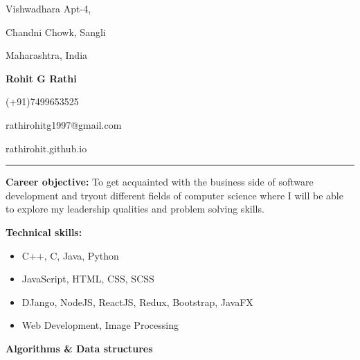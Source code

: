 \documentclass[a4paper,11pt]{article}
\begin{document}
	\begin{center}
		\begin{minipage}[b]{0.33333\textwidth}
			\raggedright
			Vishwadhara Apt-4,\par
			Chandni Chowk, Sangli\par
			Maharashtra, India
		\end{minipage}%
		\begin{minipage}[b]{0.33333\textwidth}
			\centering
			\begin{huge}
				\textbf{Rohit G Rathi}
			\end{huge}
		\end{minipage}%
		\begin{minipage}[b]{0.33333\textwidth}
			\raggedleft
			(+91)7499653525\par
			rathirohitg1997@gmail.com\par
			rathirohit.github.io\par
		\end{minipage}%
		\bigskip
		\hrule
		\vspace{0.5cm}
		\begin{minipage}[t]{1\textwidth}
			\raggedright\smallskip
			\begin{LARGE}
				\textbf{Career objective:}\medskip\linebreak%
				{\small To get acquainted with the business side of software development and tryout different fields of computer science where I will be able to explore my leadership qualities and problem solving skills.}\linebreak%
			\end{LARGE}
		\end{minipage}%
		\vspace{0.35cm}
		\begin{minipage}[t]{0.35\textwidth}
			\raggedright\smallskip
			\begin{LARGE}
				\textbf{Technical skills:}\medskip%
				{\small
					\begin{itemize}
						\item C++, C, Java, Python
						\item JavaScript, HTML, CSS, SCSS
						\item DJango, NodeJS, ReactJS, Redux, Bootstrap, JavaFX
						\item Web Development, Image Processing
					\end{itemize}
				}
				\small \textbf{Algorithms \& Data structures}
			\end{LARGE}
			\\\vspace{0.85cm}

\end{minipage}
\end{center}
\end{document}
